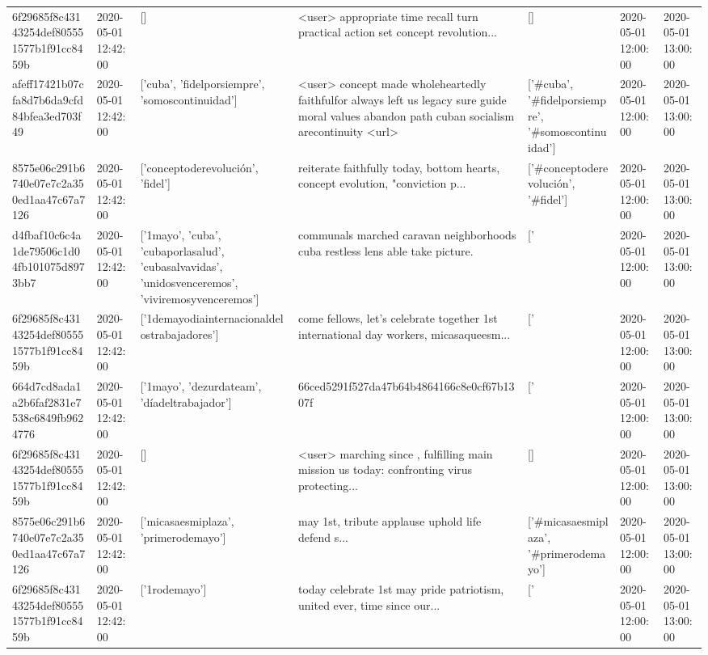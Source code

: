 \begin{tabular}{lllllll}
6f29685f8c43143254def805551577b1f91cc8459b & 2020-05-01 12:42:00 & [] & <user> appropriate time recall turn practical action set concept revolution... & [] & 2020-05-01 12:00:00 & 2020-05-01 13:00:00 \\
afeff17421b07cfa8d7b6da9cfd84bfea3ed703f49 & 2020-05-01 12:42:00 & ['cuba', 'fidelporsiempre', 'somoscontinuidad'] & <user> concept made wholeheartedly faithfulfor always left us legacy sure guide moral values abandon path cuban socialism arecontinuity <url> & ['#cuba', '#fidelporsiempre', '#somoscontinuidad'] & 2020-05-01 12:00:00 & 2020-05-01 13:00:00 \\
8575e06c291b6740e07e7c2a350ed1aa47c67a7126 & 2020-05-01 12:42:00 & ['conceptoderevolución', 'fidel'] & reiterate faithfully today, bottom hearts, concept evolution, "conviction p... & ['#conceptoderevolución', '#fidel'] & 2020-05-01 12:00:00 & 2020-05-01 13:00:00 \\
d4fbaf10c6c4a1de79506c1d04fb101075d8973bb7 & 2020-05-01 12:42:00 & ['1mayo', 'cuba', 'cubaporlasalud', 'cubasalvavidas', 'unidosvenceremos', 'viviremosyvenceremos'] & communals marched caravan neighborhoods cuba restless lens able take picture. & ['#1mayo', '#cuba', '#cubaporlasalud', '#cubasalvavidas', '#unidosvenceremos', '#viviremosyvenceremos'] & 2020-05-01 12:00:00 & 2020-05-01 13:00:00 \\
6f29685f8c43143254def805551577b1f91cc8459b & 2020-05-01 12:42:00 & ['1demayodiainternacionaldelostrabajadores'] & come fellows, let's celebrate together 1st international day workers, micasaqueesm... & ['#1demayodiainternacionaldelostrabajadores'] & 2020-05-01 12:00:00 & 2020-05-01 13:00:00 \\
664d7cd8ada1a2b6faf2831e7538c6849fb9624776 & 2020-05-01 12:42:00 & ['1mayo', 'dezurdateam', 'díadeltrabajador'] & 66ced5291f527da47b64b4864166c8e0cf67b1307f & ['#1mayo', '#dezurdateam', '#díadeltrabajador'] & 2020-05-01 12:00:00 & 2020-05-01 13:00:00 \\
6f29685f8c43143254def805551577b1f91cc8459b & 2020-05-01 12:42:00 & [] & <user> marching since , fulfilling main mission us today: confronting virus protecting... & [] & 2020-05-01 12:00:00 & 2020-05-01 13:00:00 \\
8575e06c291b6740e07e7c2a350ed1aa47c67a7126 & 2020-05-01 12:42:00 & ['micasaesmiplaza', 'primerodemayo'] & may 1st, tribute applause uphold life defend s... & ['#micasaesmiplaza', '#primerodemayo'] & 2020-05-01 12:00:00 & 2020-05-01 13:00:00 \\
6f29685f8c43143254def805551577b1f91cc8459b & 2020-05-01 12:42:00 & ['1rodemayo'] & today celebrate 1st may pride patriotism, united ever, time since our... & ['#1rodemayo'] & 2020-05-01 12:00:00 & 2020-05-01 13:00:00 \\

\end{tabular}
